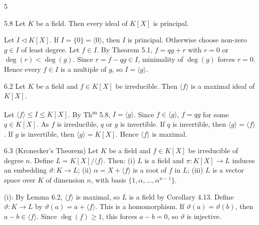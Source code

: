\documentclass[8pt]{extarticle}
\makeatletter
\renewenvironment{proof}[1][\proofname]{%
  \par%
  \pushQED{\qed}%
  \normalfont
  \topsep=2pt\partopsep=0pt\parsep=0pt\itemsep=0pt%
  \trivlist
  \item[\hskip\labelsep\itshape #1\@addpunct{.}]\ignorespaces
}{%
  \popQED\endtrivlist\@endpefalse
  \vspace{-1pt}%
}
\makeatother
\begin{document}
\begin{multicols*}{5}
        \begin{theorem}{5.8}
            Let \(K\) be a field. Then every ideal of \(K[X]\) is principal.
        \end{theorem}

        \begin{proof}
            Let \(I\lhd K[X]\). If \(I=\{0\}=\langle0\rangle\), then \(I\) is principal. Otherwise choose non-zero \(g\in I\) of least degree. Let \(f\in I\). By Theorem 5.1, \(f=qg+r\) with \(r=0\) or \(\deg(r)<\deg(g)\). Since \(r=f-qg\in I\), minimality of \(\deg(g)\) forces \(r=0\). Hence every \(f\in I\) is a multiple of \(g\), so \(I=\langle g\rangle\).
        \end{proof}

        \begin{lemma}{6.2}
            Let \(K\) be a field and \(f\in K[X]\) be irreducible. Then \(\langle f\rangle\) is a maximal ideal of \(K[X]\).
        \end{lemma}

        \begin{proof}
            Let \(\langle f\rangle\le I\le K[X]\). By Th\textsuperscript{m} 5.8, \(I=\langle g\rangle\). Since \(f\in\langle g\rangle\), \(f=qg\) for some \(q\in K[X]\). As \(f\) is irreducible, \(q\) or \(g\) is invertible. If \(q\) is invertible, then \(\langle g\rangle=\langle f\rangle\). If \(g\) is invertible, then \(\langle g\rangle=K[X]\). Hence \(\langle f\rangle\) is maximal.
        \end{proof}

        \begin{theorem}{6.3}
            (Kronecker's Theorem) Let \(K\) be a field and \(f\in K[X]\) be irreducible of degree \(n\). Define \(L=K[X]/\langle f\rangle\). Then: (i) \(L\) is a field and \(\pi:K[X]\to L\) induces an embedding \(\vartheta:K\to L\); (ii) \(\alpha=X+\langle f\rangle\) is a root of \(f\) in \(L\); (iii) \(L\) is a vector space over \(K\) of dimension \(n\), with basis \(\{1,\alpha,\ldots,\alpha^{n-1}\}\).
        \end{theorem}

        \begin{proof}
            (i): By Lemma 6.2, \(\langle f\rangle\) is maximal, so \(L\) is a field by Corollary 4.13. Define \(\vartheta:K\to L\) by \(\vartheta(a)=a+\langle f\rangle\). This is a homomorphism. If \(\vartheta(a)=\vartheta(b)\), then \(a-b\in\langle f\rangle\). Since \(\deg(f)\ge1\), this forces \(a-b=0\), so \(\vartheta\) is injective.


\end{proof}
\end{multicols*}
\end{document}

